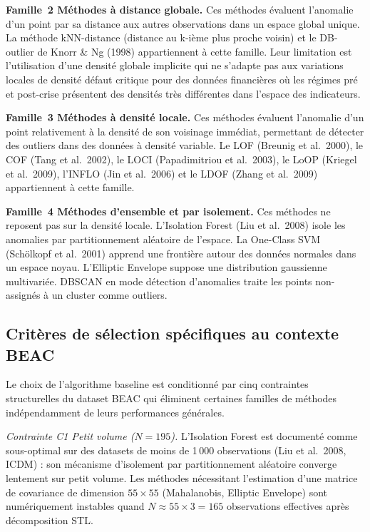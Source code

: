 \documentclass[12pt,a4paper]{article}
\begin{document}
\textbf{Famille~2  Méthodes à distance globale.} Ces méthodes évaluent
l'anomalie d'un point par sa distance aux autres observations dans un espace
global unique. La méthode kNN-distance (distance au k-ième plus proche voisin)
et le DB-outlier de Knorr \& Ng (1998) appartiennent à cette famille. Leur
limitation est l'utilisation d'une densité globale implicite qui ne s'adapte
pas aux variations locales de densité  défaut critique pour des données
financières où les régimes pré et post-crise présentent des densités très
différentes dans l'espace des indicateurs.

\textbf{Famille~3  Méthodes à densité locale.} Ces méthodes évaluent
l'anomalie d'un point relativement à la densité de son voisinage immédiat,
permettant de détecter des outliers dans des données à densité variable. Le
LOF (Breunig et al.\ 2000), le COF (Tang et al.\ 2002), le LOCI (Papadimitriou
et al.\ 2003), le LoOP (Kriegel et al.\ 2009), l'INFLO (Jin et al.\ 2006)
et le LDOF (Zhang et al.\ 2009) appartiennent à cette famille.

\textbf{Famille~4  Méthodes d'ensemble et par isolement.} Ces méthodes
ne reposent pas sur la densité locale. L'Isolation Forest (Liu et al.\ 2008)
isole les anomalies par partitionnement aléatoire de l'espace. La One-Class
SVM (Schölkopf et al.\ 2001) apprend une frontière autour des données normales
dans un espace noyau. L'Elliptic Envelope suppose une distribution gaussienne
multivariée. DBSCAN en mode détection d'anomalies traite les points
non-assignés à un cluster comme outliers.

\subsection{Critères de sélection spécifiques au contexte BEAC}

Le choix de l'algorithme baseline est conditionné par cinq contraintes
structurelles du dataset BEAC qui éliminent certaines familles de méthodes
indépendamment de leurs performances générales.

\textit{Contrainte C1  Petit volume ($N = 195$).} L'Isolation Forest est
documenté comme sous-optimal sur des datasets de moins de 1\,000 observations
(Liu et al.\ 2008, ICDM) : son mécanisme d'isolement par partitionnement
aléatoire converge lentement sur petit volume. Les méthodes nécessitant
l'estimation d'une matrice de covariance de dimension $55 \times 55$
(Mahalanobis, Elliptic Envelope) sont numériquement instables quand
$N \approx 55 \times 3 = 165$ observations effectives après décomposition STL.
\end{document}
